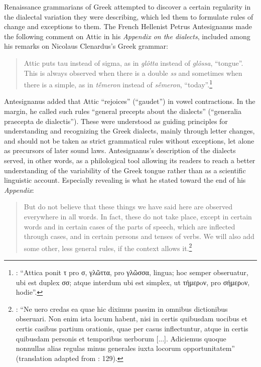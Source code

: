 Renaissance grammarians of Greek attempted to discover a certain regularity in the dialectal variation they were describing, which led them to formulate rules of change and exceptions to them. The French Hellenist Petrus Antesignanus made the following comment on Attic in his \textit{Appendix on the dialects}, included among his remarks on Nicolaus Clenardus’s Greek grammar:

\begin{quote}
Attic puts tau instead of sigma, as in \textit{glôtta} instead of \textit{glôssa}, “tongue”. This is always observed when there is a double \textit{ss} and sometimes when there is a simple, as in \textit{tḗmeron} instead of \textit{sḗmeron}, “today”.\footnote{{\citet[13]{Antesignanus1554}: “Attica ponit τ pro σ, γλῶττα, pro γλῶσσα, lingua; hoc semper obseruatur, ubi est duplex σσ; atque interdum ubi est simplex, ut τήμερoν, pro σήμερoν, hodie”.}}
\end{quote}

Antesignanus added that Attic “rejoices” (“gaudet”) in vowel contractions. In the margin, he called such rules “general precepts about the dialects” (“generalia praecepta de dialectis”). These were understood as guiding principles for understanding and recognizing the Greek dialects, mainly through letter changes, and should not be taken as strict grammatical rules without exceptions, let alone as precursors of later sound laws. Antesignanus’s description of the dialects served, in other words, as a philological tool allowing its readers to reach a better understanding of the variability of the Greek tongue rather than as a scientific linguistic account. Especially revealing is what he stated toward the end of his \textit{Appendix}:

\begin{quote}
But do not believe that these things we have said here are observed everywhere in all words. In fact, these do not take place, except in certain words and in certain cases of the parts of speech, which are inflected through cases, and in certain persons and tenses of verbs. We will also add some other, less general rules, if the context allows it.\footnote{{\citet[15]{Antesignanus1554}: “Ne uero credas ea quae hic diximus passim in omnibus dictionibus obseruari. Non enim ista locum habent, nisi in certis quibusdam uocibus et certis casibus partium orationis, quae per casus inflectuntur, atque in certis quibusdam personis et temporibus uerborum [...]. Adiciemus quoque nonnullas alias regulas minus generales iuxta locorum opportunitatem” (translation adapted from \citealt{VanRooy2016c}: 129).}}
\end{quote}


